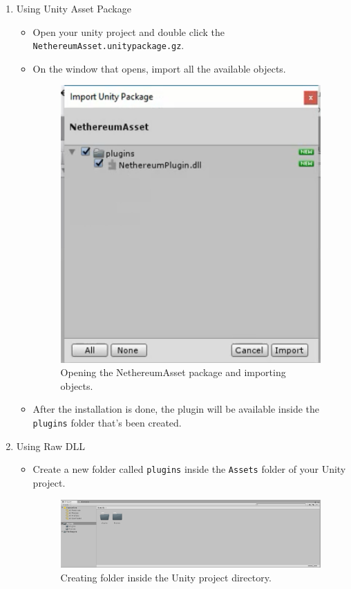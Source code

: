 \documentclass[a4paper, 11pt, titlepage]{article}
\begin{document}
\begin{enumerate}
\item Using Unity Asset Package

\begin{itemize}
\item Open your unity project and double click the \texttt{NethereumAsset.unitypackage.gz}.
\item On the window that opens, import all the available objects.

\begin{figure}[htbp]
\centering
\includegraphics[width=10cm]{./docs/image4.png}
\caption{\label{fig:orgc7fea71}
Opening the NethereumAsset package and importing objects.}
\end{figure}

\item After the installation is done, the plugin will be available inside the \texttt{plugins} folder that's been created.
\end{itemize}

\item Using Raw DLL

\begin{itemize}
\item Create a new folder called \texttt{plugins} inside the \texttt{Assets} folder of your Unity project.

\begin{figure}[htbp]
\centering
\includegraphics[width=10cm]{./docs/image5.png}
\caption{\label{fig:orga50ea65}
Creating folder inside the Unity project directory.}
\end{figure}


\end{itemize}
\end{enumerate}
\end{document}
